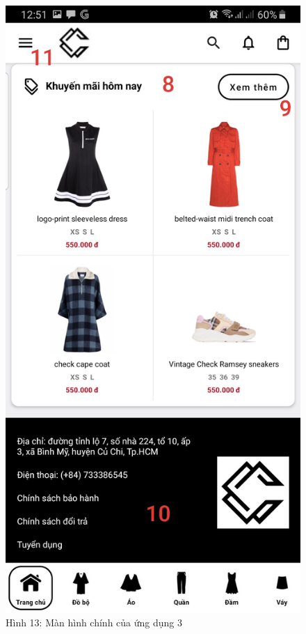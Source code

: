 \documentclass{beamer}
\begin{document}
\begin{frame}
    \begin{columns}
        \begin{figure}
            \centering
            \includegraphics[height=0.7\textheight]{images/08.png}
            \caption{\centering\tiny{Hình 13: Màn hình chính của ứng dụng 3}}


\end{figure}
\end{columns}
\end{frame}
\end{document}
